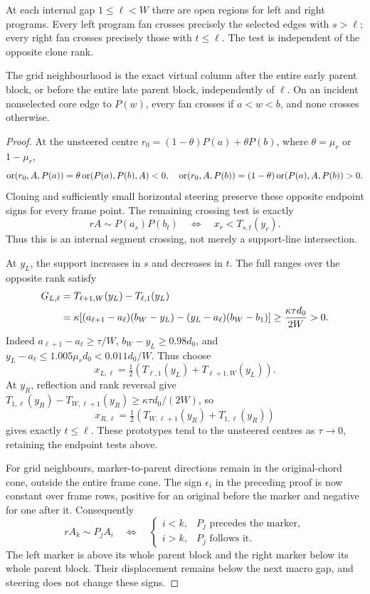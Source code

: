 \begin{lemma}\label{lem:rank-table}
At each internal gap $1\leq\ell<W$ there are open regions for left and right programs. Every left program fan crosses precisely the selected edges with $s>\ell$; every right fan crosses precisely those with $t\leq\ell$. The test is independent of the opposite clone rank.

The grid neighbourhood is the exact virtual column after the entire early parent block, or before the entire late parent block, independently of $\ell$. On an incident nonselected core edge to $P(w)$, every fan crosses if $a<w<b$, and none crosses otherwise.
\end{lemma}
\begin{proof}
At the unsteered centre $r_0=(1-\theta)P(a)+\theta P(b)$, where $\theta=\mu_r$ or $1-\mu_r$,
\[
\operatorname{or}(r_0,A,P(a))=\theta\operatorname{or}(P(a),P(b),A)<0,\quad
\operatorname{or}(r_0,A,P(b))=(1-\theta)\operatorname{or}(P(a),A,P(b))>0.
\]
Cloning and sufficiently small horizontal steering preserve these opposite endpoint signs for every frame point. The remaining crossing test is exactly
\begin{equation}\label{eq:rank-cross}
rA\sim P(a_s)P(b_t)\quad\Longleftrightarrow\quad x_r<T_{s,t}(y_r).
\end{equation}
Thus this is an internal segment crossing, not merely a support-line intersection.

At $y_L$, the support increases in $s$ and decreases in $t$. The full ranges over the opposite rank satisfy
\begin{align}
G_{L,\ell}
&=T_{\ell+1,W}(y_L)-T_{\ell,1}(y_L)\notag\\
&=\kappa[(a_{\ell+1}-a_\ell)(b_W-y_L)-(y_L-a_\ell)(b_W-b_1)]
\geq\frac{\kappa\tau d_0}{2W}>0.\label{eq:rank-gaps}
\end{align}
Indeed $a_{\ell+1}-a_\ell\geq\tau/W$, $b_W-y_L\geq0.98d_0$, and $y_L-a_\ell\leq1.005\mu_rd_0<0.011d_0/W$. Thus choose
\[
x_{L,\ell}=\tfrac12(T_{\ell,1}(y_L)+T_{\ell+1,W}(y_L)).
\]
At $y_R$, reflection and rank reversal give
$T_{1,\ell}(y_R)-T_{W,\ell+1}(y_R)\geq\kappa\tau d_0/(2W)$, so
\[
x_{R,\ell}=\tfrac12(T_{W,\ell+1}(y_R)+T_{1,\ell}(y_R))
\]
gives exactly $t\leq\ell$. These prototypes tend to the unsteered centres as $\tau\to0$, retaining the endpoint tests above.

For grid neighbours, marker-to-parent directions remain in the original-chord cone, outside the entire frame cone. The sign $\epsilon_i$ in the preceding proof is now constant over frame rows, positive for an original before the marker and negative for one after it. Consequently
\[
rA_k\sim P_jA_i\quad\Longleftrightarrow\quad
\begin{cases}i<k,&P_j\text{ precedes the marker},\\ i>k,&P_j\text{ follows it}.\end{cases}
\]
The left marker is above its whole parent block and the right marker below its whole parent block. Their displacement remains below the next macro gap, and steering does not change these signs.


\end{proof}
